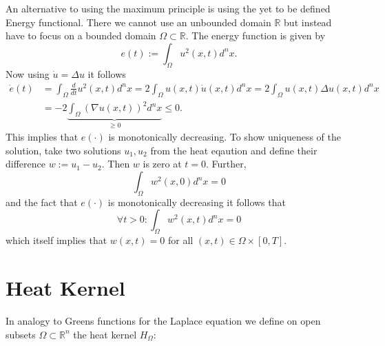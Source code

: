 \documentclass[A4,12pt,twoside]{book}
\begin{document}
An alternative to using the maximum principle is using the yet to be defined Energy functional. There we cannot use an unbounded domain $\mathbb{R}$ but instead have to focus on a bounded domain $\Omega \subset \mathbb{R}$. The energy function is given by 
\[
e(t) := \int_\Omega u^2 (x,t) d^n x.
\]
Now using $\dot{u}= \Delta u$ it follows 
\begin{align*}
\dot{e}(t) &= \int_\Omega \frac{d}{dt} u^2 (x,t) d^n x = 2 \int_\Omega u(x,t) \dot{u}(x,t) d^n x= 2 \int_\Omega u(x,t) \Delta u(x,t) d^n x \\
&=-  2 \underbrace{\int_\Omega (\nabla u(x,t) )^2  d^n x }_{\geq 0} \leq 0.
\end{align*}
This implies that $e(\cdot)$ is monotonically decreasing. To show uniqueness of the solution, take two solutions $u_1,u_2$ from the heat eqaution and define their difference $w:= u_1-u_2$. Then $w$ is zero at $t=0$. Further, 
\[
\int_\Omega w^2 (x,0) d^n x =0
\]
and the fact that $e(\cdot)$ is monotonically decreasing it follows that 
\[
\forall t >0: \int_\Omega w^2 (x,t) d^n x =0
\]
which itself implies that $w(x,t)=0$ for all $(x,t) \in \Omega \times [0,T]$.


\section{Heat Kernel}
In analogy to Greens functions for the Laplace equation we define on open subsets $\Omega \subset \mathbb{R}^n$ the heat kernel $H_\Omega$:

\end{document}
